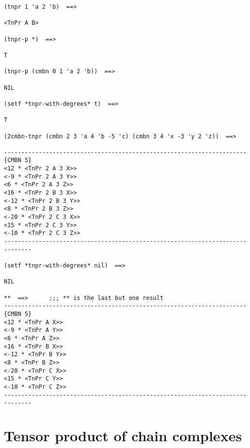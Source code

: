 {\footnotesize\begin{verbatim}
(tnpr 1 'a 2 'b)  ==>

<TnPr A B>

(tnpr-p *)  ==>

T

(tnpr-p (cmbn 0 1 'a 2 'b))  ==>

NIL

(setf *tnpr-with-degrees* t)  ==> 

T

(2cmbn-tnpr (cmbn 2 3 'a 4 'b -5 'c) (cmbn 3 4 'x -3 'y 2 'z))  ==>

----------------------------------------------------------------------{CMBN 5}
<12 * <TnPr 2 A 3 X>>
<-9 * <TnPr 2 A 3 Y>>
<6 * <TnPr 2 A 3 Z>>
<16 * <TnPr 2 B 3 X>>
<-12 * <TnPr 2 B 3 Y>>
<8 * <TnPr 2 B 3 Z>>
<-20 * <TnPr 2 C 3 X>>
<15 * <TnPr 2 C 3 Y>>
<-10 * <TnPr 2 C 3 Z>>
------------------------------------------------------------------------------

(setf *tnpr-with-degrees* nil)  ==>

NIL

**  ==>      ;;; ** is the last but one result 
----------------------------------------------------------------------{CMBN 5}
<12 * <TnPr A X>>
<-9 * <TnPr A Y>>
<6 * <TnPr A Z>>
<16 * <TnPr B X>>
<-12 * <TnPr B Y>>
<8 * <TnPr B Z>>
<-20 * <TnPr C X>>
<15 * <TnPr C Y>>
<-10 * <TnPr C Z>>
------------------------------------------------------------------------------
\end{verbatim}}
\newpage

\section{Tensor product of chain complexes}

